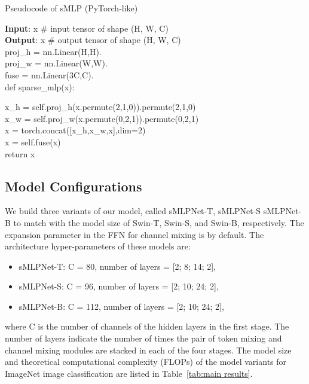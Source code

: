 \documentclass[letterpaper]{article} \usepackage{aaai22}  \usepackage{times}  \usepackage{helvet}  \usepackage{courier}  \usepackage[hyphens]{url}  \usepackage{graphicx} \usepackage{color}
\begin{document}
\begin{algorithm}[tb]
\caption{Pseudocode of sMLP (PyTorch-like)}
\label{alg:algorithm}
\textbf{Input}: x \# input tensor of shape (H, W, C)\\
\textbf{Output}: x \# output tensor of shape (H, W, C)\\

proj\_h = nn.Linear(H,H). \\
proj\_w = nn.Linear(W,W). \\
fuse = nn.Linear(3C,C). \\

def sparse\_mlp(x): \\
\begin{algorithmic}
\STATE    x\_h = self.proj\_h(x.permute(2,1,0)).permute(2,1,0) \\
    x\_w = self.proj\_w(x.permute(0,2,1)).permute(0,2,1) \\
    x = torch.concat([x\_h,x\_w,x],dim=2) \\
    x = self.fuse(x) \\
    
    return x
\end{algorithmic}
\end{algorithm}


\subsection{Model Configurations}
We build three variants of our model, called sMLPNet-T, sMLPNet-S sMLPNet-B to match with the model size of Swin-T, Swin-S, and Swin-B, respectively. The expansion parameter in the FFN for channel mixing is  by default. The architecture hyper-parameters of these models are: \begin{itemize}
    \item sMLPNet-T: C = 80, number of layers = [2; 8; 14; 2],
    \item sMLPNet-S: C = 96, number of layers = [2; 10; 24; 2],
    \item sMLPNet-B: C = 112, number of layers = [2; 10; 24; 2],
\end{itemize} 
where C is the number of channels of the hidden layers in the first stage. The number of layers indicate the number of times the pair of token mixing and channel mixing modules are stacked in each of the four stages. The model size and theoretical computational complexity (FLOPs) of the model variants for ImageNet image classification are listed in Table~\ref{tab:main results}.
\end{document}
